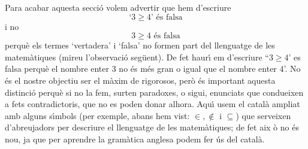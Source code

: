 Para acabar aquesta secci\'{o} volem advertir que hem d'escriure%
\begin{equation*}
\text{`}3\geq4\text{' \'{e}s falsa}
\end{equation*}
i no%
\begin{equation*}
3\geq4\text{ \'{e}s falsa}
\end{equation*}
perqu\`{e} els termes `vertadera' i `falsa' no formen part del llenguatge de
les matem\`{a}tiques (mireu l'observaci\'{o} seg\"{u}ent). De fet haur\'{\i}%
em d'escriure \textquotedblleft$3\geq4$' es falsa perqu\`{e} el nombre enter
$3$ no \'{e}s m\'{e}s gran o igual que el nombre enter $4$'. No \'{e}s el
nostre objectiu ser el m\`{a}xim de rigorosos, per\`{o} \'{e}s important
aquesta distinci\'{o} perqu\`{e} si no la fem, surten paradoxes, o sigui,
enunciats que condueixen a fets contradictoris, que no es poden donar
alhora. Aqu\'{\i} usem el catal\`{a} ampliat amb alguns s\'{\i}mbols (per
exemple, abans hem vist: $\in,\notin$ i $\subseteq$) que serveixen
d'abreujadors per descriure el llenguatge de les matem\`{a}tiques; de fet aix%
\`{o} no \'{e}s nou, ja que per aprendre la gram\`{a}tica anglesa podem fer
\'{u}s del catal\`{a}.

